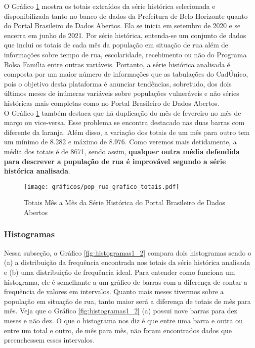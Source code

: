 \documentclass[12pt]{article}
\begin{document}
O Gráfico \ref{fig:grafico_pop_rua_totais} mostra os totais extraídos da série histórica selecionada e disponibilizada tanto no banco de dados da Prefeitura de Belo Horizonte quanto do Portal Brasileiro de Dados Abertos. Ela se inicia em setembro de 2020 e se encerra em junho de 2021. Por série histórica, entenda-se um conjunto de dados que inclui os totais de cada mês da população em situação de rua além de informações sobre tempo de rua, escolaridade, recebimento ou não do Programa Bolsa Família entre outras variáveis. Portanto, a série histórica analisada é composta por um maior número de informações que as tabulações do CadÚnico, pois o objetivo desta plataforma é anunciar tendências, sobretudo, dos dois últimos meses de inúmeras variáveis sobre populações vulneráveis e não séries históricas mais completas como no Portal Brasileiro de Dados Abertos.\\

O Gráfico \ref{fig:grafico_pop_rua_totais} também destaca que há duplicação do mês de fevereiro no mês de março ou vice-versa. Esse problema se encontra destacado nas duas barras com diferente da laranja. Além disso, a variação dos totais de um mês para outro tem um mínimo de 8.282 e máximo de 8.976. Como veremos mais detidamente, a média dos totais é de 8671, sendo assim, \textbf{qualquer outra média defendida para descrever a população de rua é improvável segundo a série histórica analisada}.\\

\begin{figure}[H]
\centering
	\caption{Totais Mês a Mês da Série Histórica do Portal Brasileiro de Dados Abertos}
	\texttt{[image: gráficos/pop\_rua\_grafico\_totais.pdf]}
	\label{fig:grafico_pop_rua_totais}
\end{figure}

\subsubsection{Histogramas}


Nessa subseção, o Gráfico \ref{fig:histogramas1_2} compara dois histogramas sendo o (a) a distribuição da frequência encontrada nos totais da série histórica analisada e (b) uma distribuição de frequência ideal. Para entender como funciona um histograma, ele é semelhante a um gráfico de barras com a diferença de contar a frequência de valores em intervalos. Quanto mais meses tivermos sobre a população em situação de rua, tanto maior será a diferença de totais de mês para mês. Veja que o Gráfico \ref{fig:histogramas1_2} (a) possui nove barras para dez meses e não dez. O que o histograma nos diz é que entre uma barra e outra ou entre um total e outro, de mês para mês, não foram encontrados dados que preenchessem esses intervalos.\\
\end{document}
